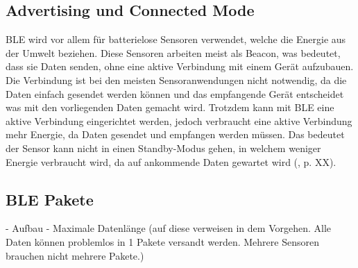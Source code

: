 \subsection{Advertising und Connected Mode}
  
BLE wird vor allem für batterielose Sensoren verwendet, welche die Energie aus der Umwelt beziehen. Diese Sensoren arbeiten meist als Beacon, was bedeutet, dass sie Daten senden, ohne eine aktive Verbindung mit einem Gerät aufzubauen. Die Verbindung ist bei den meisten Sensoranwendungen nicht notwendig, da die Daten einfach gesendet werden können und das empfangende Gerät entscheidet was mit den vorliegenden Daten gemacht wird. Trotzdem kann mit BLE eine aktive Verbindung eingerichtet werden, jedoch verbraucht eine aktive Verbindung mehr Energie, da Daten gesendet und empfangen werden müssen. Das bedeutet der Sensor kann nicht in einen Standby-Modus gehen, in welchem weniger Energie verbraucht wird, da auf ankommende Daten gewartet wird (\cite{BLE_Book}, p. XX).



\subsection{BLE Pakete}

- Aufbau
- Maximale Datenlänge  (auf diese verweisen in dem Vorgehen. Alle Daten können problemlos in 1 Pakete versandt werden. Mehrere Sensoren brauchen nicht mehrere Pakete.)




